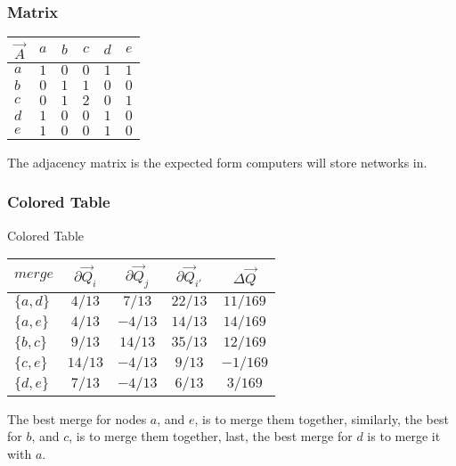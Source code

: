 \documentclass{beamer}
\begin{document}
\begin{frame}

    \frametitle{Matrix}

    \begin{center}
        \begin{tabular}{l | c c c c c} 
            $ \vec{A} $ & $ a $ & $ b $ & $ c $ & $ d $ & $ e $ \\
            \hline
            $ a $ & $ 1 $ & $ 0 $ & $ 0 $ & $ 1 $ & $ 1 $ \\
            $ b $ & $ 0 $ & $ 1 $ & $ 1 $ & $ 0 $ & $ 0 $ \\
            $ c $ & $ 0 $ & $ 1 $ & $ 2 $ & $ 0 $ & $ 1 $ \\
            $ d $ & $ 1 $ & $ 0 $ & $ 0 $ & $ 1 $ & $ 0 $ \\
            $ e $ & $ 1 $ & $ 0 $ & $ 0 $ & $ 1 $ & $ 0 $ \\
        \end{tabular}
    \end{center}\pause

    \vspace{2.5mm}
    The adjacency matrix is the expected form computers will store networks in. 

\end{frame}

\begin{frame}

    \frametitle{Colored Table}

    Colored Table
    \begin{center}
        \begin{tabular}{l | c c c c} 
            $ merge    $ & $ \partial \vec{Q}_{i} $ & $ \partial \vec{Q}_{j} $ & $ \partial \vec{Q}_{i'} $ & $ \Delta \vec{Q} $ \\
            \hline
            \rowcolor{ummaize}
            $ \{a, d\} $ & $ 4/13  $ & $  7/13  $ & $ 22/13 $ & $ 11/169 $ \\
            \rowcolor{ummaize}
            $ \{a, e\} $ & $ 4/13  $ & $ -4/13  $ & $ 14/13 $ & $ 14/169 $ \\
            \rowcolor{ummaize}
            $ \{b, c\} $ & $  9/13 $ & $  14/13 $ & $ 35/13 $ & $ 12/169 $ \\
            $ \{c, e\} $ & $ 14/13 $ & $ -4/13  $ & $  9/13 $ & $ -1/169 $ \\
            $ \{d, e\} $ & $  7/13 $ & $ -4/13  $ & $  6/13 $ & $  3/169 $ \\
        \end{tabular}
    \end{center}\pause

    \vspace{2.5mm}
    The best merge for nodes $ a $, and $ e $, is to merge them together, similarly, the best for $ b $, and $ c $, is to merge them together, last, the best merge for $ d $ is to merge it with $ a $. 

\end{frame}
\end{document}
